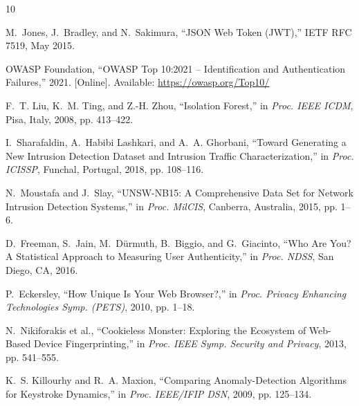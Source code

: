 \documentclass[conference]{IEEEtran}
\begin{document}
\begin{thebibliography}{10}

M.~Jones, J.~Bradley, and N.~Sakimura, ``JSON Web Token (JWT),'' IETF RFC 7519, May 2015.

OWASP Foundation, ``OWASP Top 10:2021 -- Identification and Authentication Failures,'' 2021. [Online]. Available: \url{https://owasp.org/Top10/}

F.~T. Liu, K.~M. Ting, and Z.-H. Zhou, ``Isolation Forest,'' in \emph{Proc. IEEE ICDM}, Pisa, Italy, 2008, pp. 413--422.

I.~Sharafaldin, A.~Habibi Lashkari, and A.~A. Ghorbani, ``Toward Generating a New Intrusion Detection Dataset and Intrusion Traffic Characterization,'' in \emph{Proc. ICISSP}, Funchal, Portugal, 2018, pp. 108--116.

N.~Moustafa and J.~Slay, ``UNSW-NB15: A Comprehensive Data Set for Network Intrusion Detection Systems,'' in \emph{Proc. MilCIS}, Canberra, Australia, 2015, pp. 1--6.

D.~Freeman, S.~Jain, M.~D{\"u}rmuth, B.~Biggio, and G.~Giacinto, ``Who Are You? A Statistical Approach to Measuring User Authenticity,'' in \emph{Proc. NDSS}, San Diego, CA, 2016.

P.~Eckersley, ``How Unique Is Your Web Browser?,'' in \emph{Proc. Privacy Enhancing Technologies Symp. (PETS)}, 2010, pp. 1--18.

N.~Nikiforakis et al., ``Cookieless Monster: Exploring the Ecosystem of Web-Based Device Fingerprinting,'' in \emph{Proc. IEEE Symp. Security and Privacy}, 2013, pp. 541--555.

K.~S. Killourhy and R.~A. Maxion, ``Comparing Anomaly-Detection Algorithms for Keystroke Dynamics,'' in \emph{Proc. IEEE/IFIP DSN}, 2009, pp. 125--134.

\end{thebibliography}
\end{document}
